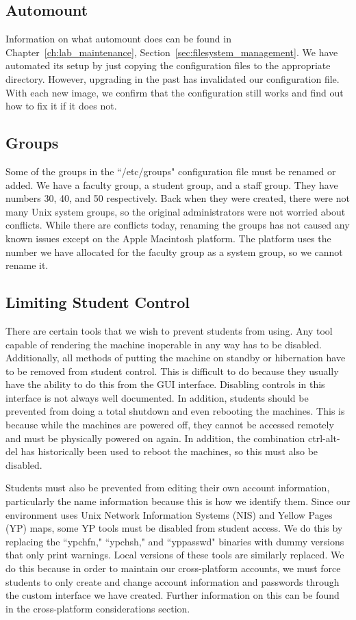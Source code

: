 \subsection{Automount}
Information on what automount does can be found in Chapter~\ref{ch:lab_maintenance}, Section~\ref{sec:filesystem_management}.  We have automated its setup by just copying the configuration files to the appropriate directory.  However, upgrading in the past has invalidated our configuration file.  With each new image, we confirm that the configuration still works and find out how to fix it if it does not. 

\subsection{Groups}
Some of the groups in the ``/etc/groups" configuration file must be renamed or added.  We have a faculty group, a student group, and a staff group.  They have numbers 30, 40, and 50 respectively.  Back when they were created, there were not many Unix system groups, so the original administrators were not worried about conflicts.  While there are conflicts today, renaming the groups has not caused any known issues except on the Apple Macintosh platform.  The platform uses the number we have allocated for the faculty group as a system group, so we cannot rename it. 

\subsection{Limiting Student Control}
There are certain tools that we wish to prevent students from using.  Any tool capable of rendering the machine inoperable in any way has to be disabled.  Additionally, all methods of putting the machine on standby or hibernation have to be removed from student control.  This is difficult to do because they usually have the ability to do this from the GUI interface.  Disabling controls in this interface is not always well documented.  In addition, students should be prevented from doing a total shutdown and even rebooting the machines.  This is because while the machines are powered off, they cannot be accessed remotely and must be physically powered on again.  In addition, the combination ctrl-alt-del has historically been used to reboot the machines, so this must also be disabled.  

Students must also be prevented from editing their own account information, particularly the name information because this is how we identify them.  Since our environment uses Unix Network Information Systems (NIS) and Yellow Pages (YP) maps, some YP tools must be disabled from student access.  We do this by replacing the ``ypchfn," ``ypchsh," and ``yppasswd" binaries with dummy versions that only print warnings.  Local versions of these tools are similarly replaced.  We do this because in order to maintain our cross-platform accounts, we must force students to only create and change account information and passwords through the custom interface we have created.  Further information on this can be found in the cross-platform considerations section.

